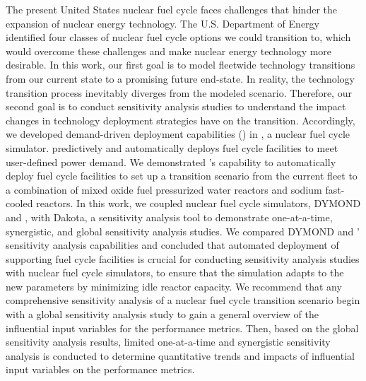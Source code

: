 \vspace{-1cm}
\small
The present United States nuclear fuel cycle faces challenges that hinder 
the expansion of nuclear energy technology. 
The U.S. Department of Energy identified four classes of nuclear fuel cycle 
options we could transition to, which would overcome these challenges 
and make nuclear energy technology more desirable. 
In this work, our first goal is to model fleetwide technology
transitions from our current
state to a promising future end-state.
In reality, the technology transition process inevitably diverges from the 
modeled scenario. 
Therefore, our second goal is to conduct sensitivity analysis 
studies to understand the impact changes in technology deployment 
strategies have on the transition. 
Accordingly, we developed demand-driven deployment capabilities 
(\deploy) in \Cyclus, a nuclear fuel cycle simulator. 
\deploy predictively and automatically deploys fuel cycle facilities 
to meet user-defined power demand.
We demonstrated \deploy's capability to automatically deploy fuel 
cycle facilities to set up a transition scenario from the current 
fleet to a combination of mixed oxide fuel pressurized water reactors 
and sodium fast-cooled reactors. 
In this work, we coupled nuclear fuel cycle simulators, DYMOND 
and \Cyclus, with Dakota, a sensitivity analysis tool to demonstrate 
one-at-a-time, synergistic, and global sensitivity analysis studies.
We compared DYMOND and \Cyclus' sensitivity analysis capabilities 
and concluded that automated deployment of supporting fuel cycle 
facilities is crucial for conducting sensitivity analysis studies 
with nuclear fuel cycle simulators, to ensure that the simulation 
adapts to the new parameters by minimizing idle reactor capacity. 
We recommend that any comprehensive sensitivity analysis of a 
nuclear fuel cycle transition scenario begin with a global 
sensitivity analysis study to gain a general overview of the 
influential input variables for the performance metrics. 
Then, based on the global sensitivity analysis results, limited 
one-at-a-time and synergistic sensitivity analysis is conducted 
to determine quantitative trends and impacts of influential 
input variables on the performance metrics.
